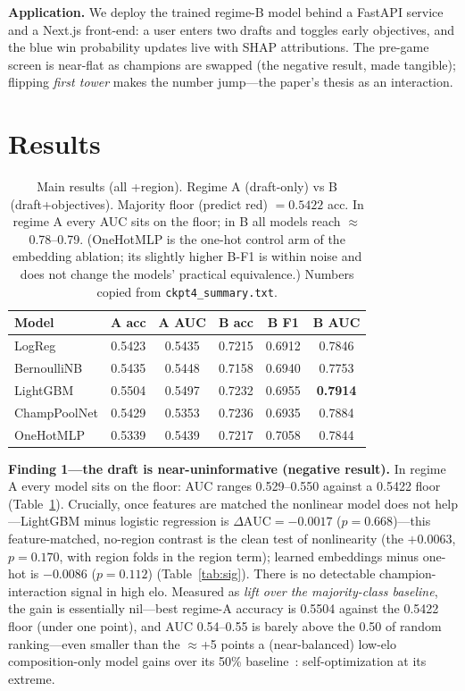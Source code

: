\documentclass[sigconf,nonacm]{acmart}
\begin{document}
\textbf{Application.} We deploy the trained regime-B model behind a FastAPI
service and a Next.js front-end: a user enters two drafts and toggles early
objectives, and the blue win probability updates live with SHAP attributions. The
pre-game screen is near-flat as champions are swapped (the negative result, made
tangible); flipping \emph{first tower} makes the number jump---the paper's thesis
as an interaction.

\section{Results}
\label{sec:results}

\begin{table}[t]
\caption{Main results (all +region). Regime A (draft-only) vs B
(draft+objectives). Majority floor (predict red) $= 0.5422$ acc. In regime A every
AUC sits on the floor; in B all models reach $\approx$0.78--0.79. (OneHotMLP is
the one-hot control arm of the embedding ablation; its slightly higher B-F1 is
within noise and does not change the models' practical equivalence.) Numbers
copied from \texttt{ckpt4\_summary.txt}.}
\label{tab:main}
\footnotesize
\begin{tabular}{lccccc}
\toprule
Model & A acc & A AUC & B acc & B F1 & B AUC \\
\midrule
LogReg & 0.5423 & 0.5435 & 0.7215 & 0.6912 & 0.7846 \\
BernoulliNB & 0.5435 & 0.5448 & 0.7158 & 0.6940 & 0.7753 \\
LightGBM & 0.5504 & 0.5497 & 0.7232 & 0.6955 & \textbf{0.7914} \\
ChampPoolNet & 0.5429 & 0.5353 & 0.7236 & 0.6935 & 0.7884 \\
OneHotMLP & 0.5339 & 0.5439 & 0.7217 & 0.7058 & 0.7844 \\
\bottomrule
\end{tabular}
\end{table}

\textbf{Finding 1---the draft is near-uninformative (negative result).} In regime
A every model sits on the floor: AUC ranges 0.529--0.550 against a 0.5422 floor
(Table~\ref{tab:main}). Crucially, once features are matched the nonlinear model
does not help---LightGBM minus logistic regression is
$\Delta\text{AUC} = -0.0017$ ($p = 0.668$)---this feature-matched, no-region
contrast is the clean test of nonlinearity (the $+0.0063$, $p = 0.170$, with
region folds in the region term); learned embeddings minus one-hot is $-0.0086$
($p = 0.112$) (Table~\ref{tab:sig}). There is no detectable champion-interaction
signal in high elo. Measured as \emph{lift over the majority-class baseline}, the
gain is essentially nil---best regime-A accuracy is 0.5504 against the 0.5422
floor (under one point), and AUC 0.54--0.55 is barely above the 0.50 of random
ranking---even smaller than the $\approx$+5 points a (near-balanced) low-elo
composition-only model gains over its 50\% baseline~\cite{comp}:
self-optimization at its extreme.
\end{document}
